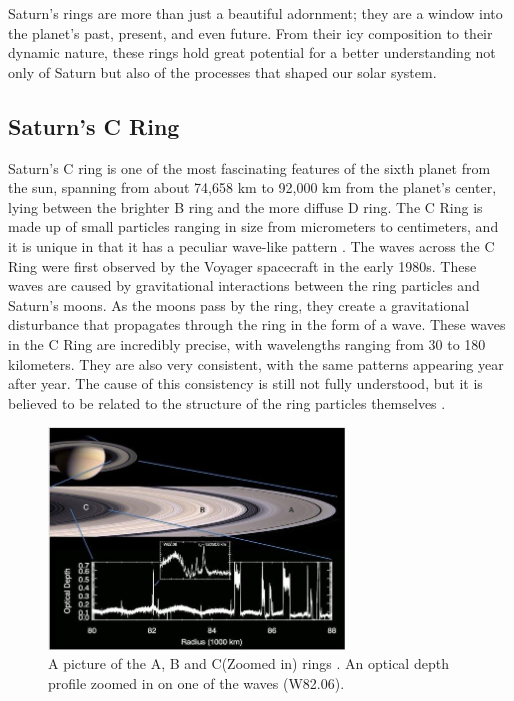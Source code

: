 \documentclass{article}
\begin{document}
Saturn's rings are more than just a beautiful adornment; they are a window into the planet's past, present, and even future. From their icy composition to their dynamic nature, these rings hold great potential for a better understanding not only of Saturn but also of the processes that shaped our solar system.


\subsection{Saturn’s C Ring}
Saturn's C ring is one of the most fascinating features of the sixth planet from the sun, spanning from about 74,658 km to 92,000 km from the planet's center, lying between the brighter B ring and the more diffuse D ring. The C Ring is made up of small particles ranging in size from micrometers to centimeters, and it is unique in that it has a peculiar wave-like pattern \cite{2009sfch.book..375C}\cite{Hedman_2018}\cite{Nicholson1990AnAR}. The waves across the C Ring were first observed by the Voyager spacecraft in the early 1980s. These waves are caused by gravitational interactions between the ring particles and Saturn's moons. As the moons pass by the ring, they create a gravitational disturbance that propagates through the ring in the form of a wave\cite{Hedman_2013}\cite{2014MNRAS.444.1369H}\cite{Hedman_2018}\cite{Marley1993PlanetaryAM}\cite{Nicholson1990AnAR}. These waves in the C Ring are incredibly precise, with wavelengths ranging from 30 to 180 kilometers. They are also very consistent, with the same patterns appearing year after year. The cause of this consistency is still not fully understood, but it is believed to be related to the structure of the ring particles themselves \cite{Hedman_2013}\cite{2014MNRAS.444.1369H}\cite{Hedman_2018}.

\begin{figure}[h] 
\centering
\includegraphics[width=0.7\textwidth]{Ring_Picture_Hedman_2018.jpg}
\caption{A picture of the A, B and C(Zoomed in) rings \cite{Hedman_2018}. An optical depth profile zoomed in on one of the waves (W82.06).} \label{fig:my_label}
\end{figure}
\end{document}
